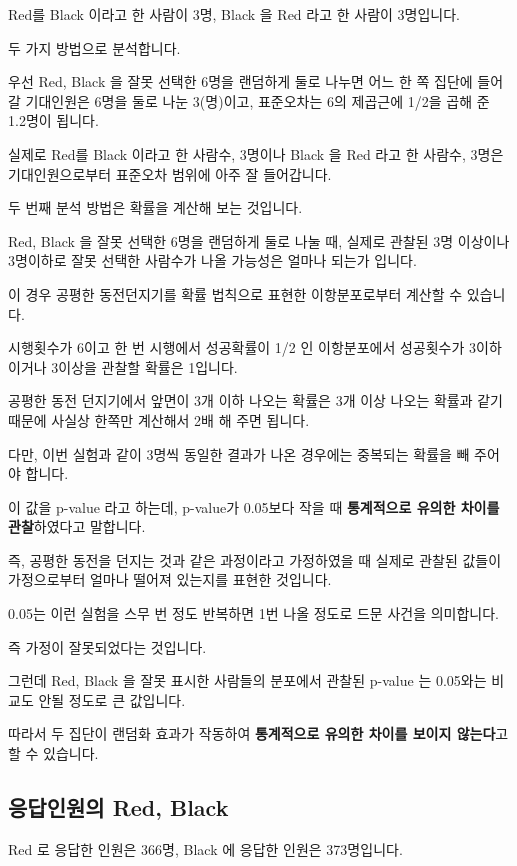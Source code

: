 \documentclass[
]{book}
\begin{document}
Red를 Black 이라고 한 사람이 3명, Black 을 Red 라고 한 사람이 3명입니다.

두 가지 방법으로 분석합니다.

우선 Red, Black 을 잘못 선택한 6명을 랜덤하게 둘로 나누면 어느 한 쪽 집단에 들어갈 기대인원은 6명을 둘로 나눈 3(명)이고, 표준오차는 6의 제곱근에 1/2을 곱해 준 1.2명이 됩니다.

실제로 Red를 Black 이라고 한 사람수, 3명이나 Black 을 Red 라고 한 사람수, 3명은 기대인원으로부터 표준오차 범위에 아주 잘 들어갑니다.

두 번째 분석 방법은 확률을 계산해 보는 것입니다.

Red, Black 을 잘못 선택한 6명을 랜덤하게 둘로 나눌 때, 실제로 관찰된 3명 이상이나 3명이하로 잘못 선택한 사람수가 나올 가능성은 얼마나 되는가 입니다.

이 경우 공평한 동전던지기를 확률 법칙으로 표현한 이항분포로부터 계산할 수 있습니다.

시행횟수가 6이고 한 번 시행에서 성공확률이 1/2 인 이항분포에서 성공횟수가 3이하이거나 3이상을 관찰할 확률은 1입니다.

공평한 동전 던지기에서 앞면이 3개 이하 나오는 확률은 3개 이상 나오는 확률과 같기 때문에 사실상 한쪽만 계산해서 2배 해 주면 됩니다.

다만, 이번 실험과 같이 3명씩 동일한 결과가 나온 경우에는 중복되는 확률을 빼 주어야 합니다.

이 값을 p-value 라고 하는데, p-value가 0.05보다 작을 때 \textbf{통계적으로 유의한 차이를 관찰}하였다고 말합니다.

즉, 공평한 동전을 던지는 것과 같은 과정이라고 가정하였을 때 실제로 관찰된 값들이 가정으로부터 얼마나 떨어져 있는지를 표현한 것입니다.

0.05는 이런 실험을 스무 번 정도 반복하면 1번 나올 정도로 드문 사건을 의미합니다.

즉 가정이 잘못되었다는 것입니다.

그런데 Red, Black 을 잘못 표시한 사람들의 분포에서 관찰된 p-value 는 0.05와는 비교도 안될 정도로 큰 값입니다.

따라서 두 집단이 랜덤화 효과가 작동하여 \textbf{통계적으로 유의한 차이를 보이지 않는다}고 할 수 있습니다.

\subsection{응답인원의 Red, Black}\label{uxc751uxb2f5uxc778uxc6d0uxc758-red-black-7}

Red 로 응답한 인원은 366명, Black 에 응답한 인원은 373명입니다.
\end{document}
